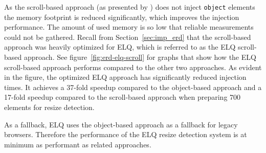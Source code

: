 \documentclass{acm_proc_article-sp}
\newcommand{\code}[1]{\texttt{#1}}
\newcommand{\elq}{ELQ}
\begin{document}
    As the scroll-based approach (as presented by \cite{backalley}) does not inject \code{object} elements the memory footprint is reduced significantly, which improves the injection performance.
    The amount of used memory is so low that reliable measurements could not be gathered.
    Recall from Section~\ref{sec:imp_erd} that the scroll-based approach was heavily optimized for \elq{}, which is referred to as the \elq{} scroll-based approach.
    See figure~\ref{fig:erd-elq-scroll} for graphs that show how the \elq{} scroll-based approach performs compared to the other two approaches.
    As evident in the figure, the optimized \elq{} approach has significantly reduced injection times.
    It achieves a 37-fold speedup compared to the object-based approach and a 17-fold speedup compared to the scroll-based approach when preparing 700 elements for resize detection.

    As a fallback, \elq{} uses the object-based approach as a fallback for legacy browsers.
    Therefore the performance of the \elq{} resize detection system is at minimum as performant as related approaches.

\end{document}
